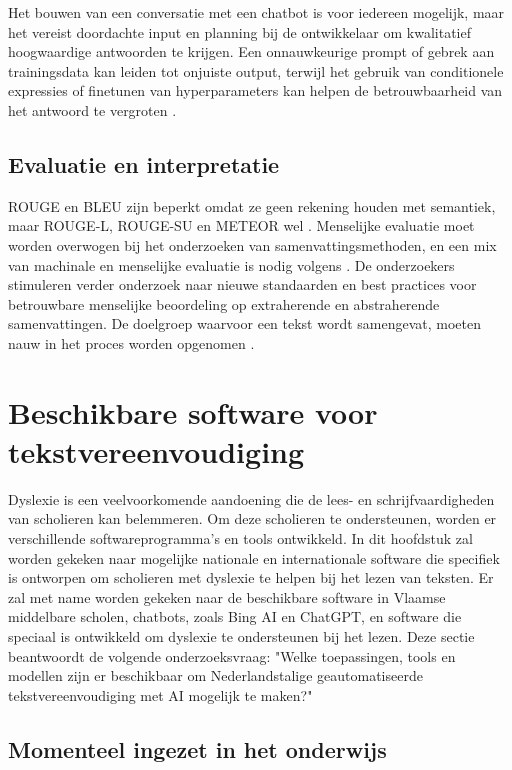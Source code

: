 Het bouwen van een conversatie met een chatbot is voor iedereen mogelijk, maar het vereist doordachte input en planning bij de ontwikkelaar om kwalitatief hoogwaardige antwoorden te krijgen. Een onnauwkeurige prompt of gebrek aan trainingsdata kan leiden tot onjuiste output, terwijl het gebruik van conditionele expressies of finetunen van hyperparameters kan helpen de betrouwbaarheid van het antwoord te vergroten \autocite{Miszczak2023, Jiang2023}.

\subsection{Evaluatie en interpretatie}

ROUGE en BLEU zijn beperkt omdat ze geen rekening houden met semantiek, maar ROUGE-L, ROUGE-SU en METEOR wel \autocite{Raj2017, Tatman2019}. Menselijke evaluatie moet worden overwogen bij het onderzoeken van samenvattingsmethoden, en een mix van machinale en menselijke evaluatie is nodig volgens \textcite{Fabbri2020}. De onderzoekers stimuleren verder onderzoek naar nieuwe standaarden en best practices voor betrouwbare menselijke beoordeling op extraherende en abstraherende samenvattingen. De doelgroep waarvoor een tekst wordt samengevat, moeten nauw in het proces worden opgenomen \autocite{Iskender2021}.

\section{Beschikbare software voor tekstvereenvoudiging}

Dyslexie is een veelvoorkomende aandoening die de lees- en schrijfvaardigheden van scholieren kan belemmeren. Om deze scholieren te ondersteunen, worden er verschillende softwareprogramma's en tools ontwikkeld. In dit hoofdstuk zal worden gekeken naar mogelijke nationale en internationale software die specifiek is ontworpen om scholieren met dyslexie te helpen bij het lezen van teksten. Er zal met name worden gekeken naar de beschikbare software in Vlaamse middelbare scholen, chatbots, zoals Bing AI en ChatGPT, en software die speciaal is ontwikkeld om dyslexie te ondersteunen bij het lezen. Deze sectie beantwoordt de volgende onderzoeksvraag: "Welke toepassingen, tools en modellen zijn er beschikbaar om Nederlandstalige geautomatiseerde tekstvereenvoudiging met AI mogelijk te maken?"

\subsection{Momenteel ingezet in het onderwijs}

